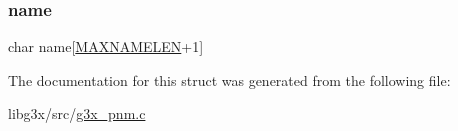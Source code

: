 \mbox{\label{struct_g3_ximgnames_ac2cd9523d5ab409e403a59e0e21f114a}} 
\subsubsection{\texorpdfstring{name}{name}}
{\footnotesize\ttfamily char name\mbox{[}\hyperlink{g3x__pnm_8c_a56739a38cf3fb0c5d7d842fe94f96f86}{M\+A\+X\+N\+A\+M\+E\+L\+EN}+1\mbox{]}}



The documentation for this struct was generated from the following file\+:\begin{DoxyCompactItemize}
\item 
libg3x/src/\hyperlink{g3x__pnm_8c}{g3x\+\_\+pnm.\+c}\end{DoxyCompactItemize}
